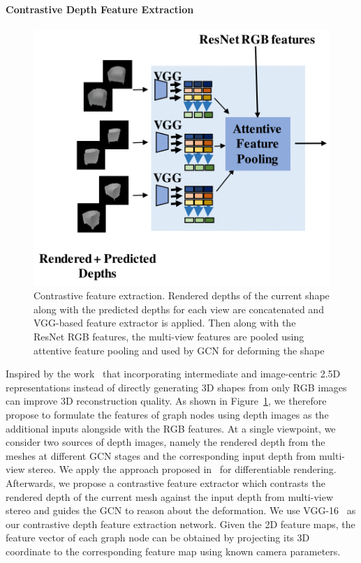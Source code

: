 \label{subsec:contrastive_depth_feature_extraction}
\paragraph{Contrastive Depth Feature Extraction}\vspace{-4mm}
\begin{figure}[th!]
    \begin{center}
        \includegraphics[width=\linewidth]{imgs/contrastive_feature_extractor.png}
    \end{center}
        \caption{Contrastive feature extraction. Rendered depths of the current shape along with the predicted depths for each view are concatenated and VGG-based feature extractor is applied. Then along with the ResNet RGB features, the multi-view features are pooled using attentive feature pooling and used by GCN for deforming the shape}
        \label{fig:contrastive_feature_extractor}
\end{figure}

Inspired by the work~\cite{yao2020front2back} that incorporating intermediate and image-centric 2.5D representations instead of directly generating 3D shapes from only RGB images~\cite{wang2018pixel2mesh,wen2019pixel2mesh++} can improve 3D reconstruction quality.
As shown in Figure~\ref{fig:contrastive_feature_extractor}, we therefore propose to formulate the features of graph nodes using depth images as the additional inputs alongside with the RGB features.
At a single viewpoint, we consider two sources of depth images, namely the rendered depth from the meshes at different GCN stages and the corresponding input depth from multi-view stereo.
We apply the approach proposed in~\cite{kato2018renderer} for differentiable rendering.
Afterwards, we propose a contrastive feature extractor which contrasts the rendered depth of the current mesh against the input depth from multi-view stereo and guides the GCN to reason about the deformation.
We use VGG-16~\cite{simonyan2014vgg} as our contrastive depth feature extraction network.
Given the 2D feature maps, the feature vector of each graph node can be obtained by projecting its 3D coordinate to the corresponding feature map using known camera parameters.


